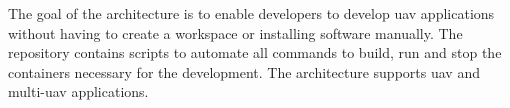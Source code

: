 The goal of the architecture is to enable developers to develop \acs{uav} applications without having to create a workspace or installing software manually. The repository contains scripts to automate all commands to build, run and stop the containers necessary for the development. The architecture supports \acs{uav} and multi\hyp{}\acs{uav} applications.